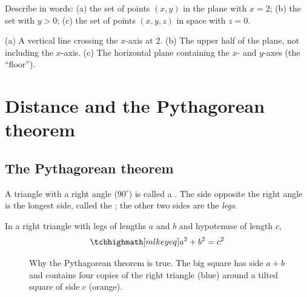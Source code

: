 \begin{exercise}
Describe in words: (a) the set of points $(x,y)$ in the plane with $x = 2$;
(b) the set with $y > 0$; (c) the set of points $(x, y, z)$ in space with
$z = 0$.
\end{exercise}
\begin{solution}
(a) A vertical line crossing the $x$-axis at $2$. (b) The upper half of the
plane, not including the $x$-axis. (c) The horizontal plane containing the
$x$- and $y$-axes (the ``floor'').
\end{solution}

\section{Distance and the Pythagorean theorem}\label{sec:distance}

\subsection{The Pythagorean theorem}

A triangle with a right angle ($90^\circ$) is called a
. The side opposite the right angle is the longest side,
called the ; the other two sides are the \emph{legs}.

\begin{theorem}\label{thm:pythagoras}
In a right triangle with legs of lengths $a$ and $b$ and hypotenuse of length
$c$,
\[
  \keyeq{a^2 + b^2 = c^2}
\]
\end{theorem}

\begin{figure}[htbp]
\centering
{}
\caption{Why the Pythagorean theorem is true. The big square has side
  $a + b$ and contains four copies of the right triangle (blue) around a tilted
  square of side $c$ (orange).}
\label{fig:pythagoras-proof}
\end{figure}

